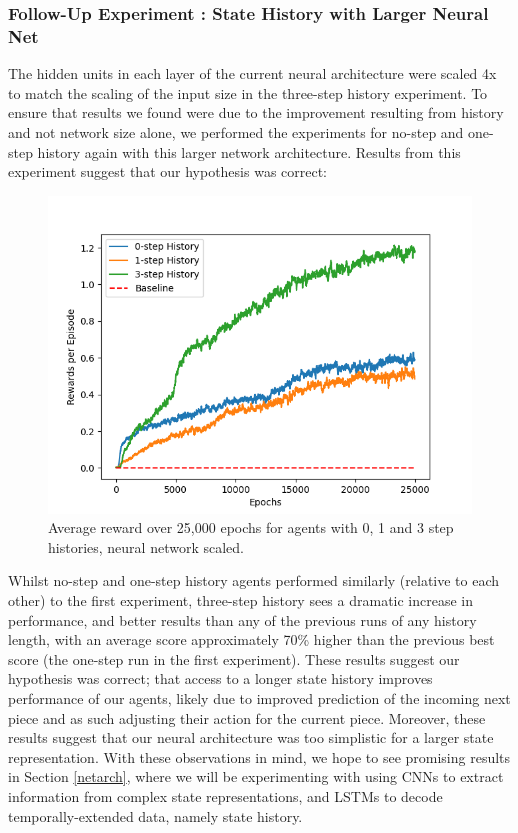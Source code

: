 \documentclass[12pt]{article}
\begin{document}
\subsubsection{Follow-Up Experiment : State History with Larger Neural Net}\label{followupPPO}
The hidden units in each layer of the current neural architecture were scaled 4x to match the scaling of the input size in the three-step history experiment. To ensure that results we found were due to the improvement resulting from history and not network size alone, we performed the experiments for no-step and one-step history again with this larger network architecture. Results from this experiment suggest that our hypothesis was correct: 
\begin{figure}[H]
    \centering
    \includegraphics[scale=0.7]{19.png}
    \caption{Average reward over 25,000 epochs for agents with 0, 1 and 3 step histories, neural network scaled.}
\end{figure}
Whilst no-step and one-step history agents performed similarly (relative to each other) to the first experiment, three-step history sees a dramatic increase in performance, and better results than any of the previous runs of any history length, with an average score approximately 70\% higher than the previous best score (the one-step run in the first experiment). 
These results suggest our hypothesis was correct; that access to a longer state history improves performance of our agents, likely due to improved prediction of the incoming next piece and as such adjusting their action for the current piece. Moreover, these results suggest that our neural architecture was too simplistic for a larger state representation. With these observations in mind, we hope to see promising results in Section \ref{netarch}, where we will be experimenting with using CNNs to extract information from complex state representations, and LSTMs to decode temporally-extended data, namely state history. 
\end{document}
